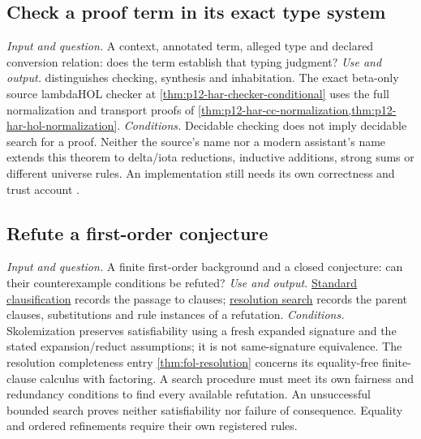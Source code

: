 \subsection{Check a proof term in its exact type system}
\label{sec:p14-finder-type-checking}
\textit{Input and question.} A context, annotated term, alleged type and
declared conversion relation: does the term establish that typing judgment?
\textit{Use and output.}  distinguishes
checking, synthesis and inhabitation. The exact beta-only source
lambdaHOL checker at \cref{thm:p12-har-checker-conditional} uses the
full normalization and transport proofs of
\cref{thm:p12-har-cc-normalization,thm:p12-har-hol-normalization}.
\textit{Conditions.} Decidable checking does not imply decidable search
for a proof. Neither the source's name nor a modern assistant's name
extends this theorem to delta/iota reductions, inductive additions,
strong sums or different universe rules. An implementation still needs
its own correctness and trust account
\cite{BarendregtGeuvers2001,Geuvers1994Report9450}.

\subsection{Refute a first-order conjecture}
\label{sec:p14-finder-first-order}
\textit{Input and question.} A finite first-order background and a closed
conjecture: can their counterexample conditions be refuted?
\textit{Use and output.}
\hyperref[sec:p12-small-clause-standard]{Standard clausification} records
the passage to clauses; \hyperref[def:p12-resolution-search]{resolution search}
records the parent clauses, substitutions and rule instances of a refutation.
\textit{Conditions.} Skolemization preserves satisfiability using a fresh
expanded signature and the stated expansion/reduct assumptions; it is not
same-signature equivalence. The resolution completeness entry
\cref{thm:fol-resolution} concerns its equality-free finite-clause calculus
with factoring. A search procedure must meet its own fairness and redundancy
conditions to find every available refutation. An unsuccessful
bounded search proves neither satisfiability nor failure of consequence.
Equality and ordered refinements require their own registered rules.

